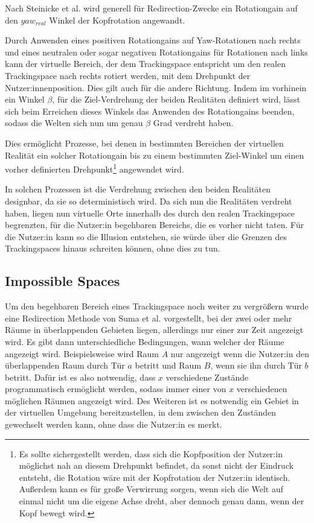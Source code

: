 Nach Steinicke et al. \cite{detection-thresholds} wird generell für Redirection-Zwecke ein Rotationgain auf den $yaw_{real}$ Winkel der Kopfrotation angewandt.

Durch Anwenden eines positiven Rotationgains auf Yaw-Rotationen nach rechts und eines neutralen oder sogar negativen Rotationgains für Rotationen nach links kann der virtuelle Bereich, der dem Trackingspace entspricht um den realen Trackingspace nach rechts rotiert werden, mit dem Drehpunkt der Nutzer:innenposition. Dies gilt auch für die andere Richtung. Indem im vorhinein ein Winkel $\beta$, für die Ziel-Verdrehung der beiden Realitäten definiert wird, lässt sich beim Erreichen dieses Winkels das Anwenden des Rotationgains beenden, sodass die Welten sich nun um genau $\beta$ Grad verdreht haben.

Dies ermöglicht Prozesse, bei denen in bestimmten Bereichen der virtuellen Realität ein solcher  Rotationgain bis zu einem bestimmten Ziel-Winkel um einen vorher definierten Drehpunkt\footnote{Es sollte sichergestellt werden, dass sich die Kopfposition der Nutzer:in möglichst nah an diesem Drehpunkt befindet, da sonst nicht der Eindruck entsteht, die Rotation wäre mit der Kopfrotation der Nutzer:in identisch. Außerdem kann es für große Verwirrung sorgen, wenn sich die Welt auf einmal nicht um die eigene Achse dreht, aber dennoch genau dann, wenn der Kopf bewegt wird.} angewendet wird.

In solchen Prozessen ist die Verdrehung zwischen den beiden Realitäten designbar, da sie so deterministisch wird. Da sich nun die Realitäten verdreht haben, liegen nun virtuelle Orte innerhalb des durch den realen Trackingspace begrenzten, für die Nutzer:in begehbaren Bereichs, die es vorher nicht taten.
Für die Nutzer:in kann so die Illusion entstehen, sie würde über die Grenzen des Trackingspaces hinaus schreiten können, ohne dies zu tun. %

\subsection{Impossible Spaces}
Um den begehbaren Bereich eines Trackingspace noch weiter zu vergrößern wurde eine Redirection Methode von Suma et al. \cite{impossible-spaces-suma} vorgestellt, bei der zwei oder mehr Räume in überlappenden Gebieten liegen, allerdings nur einer zur Zeit angezeigt wird. Es gibt dann unterschiedliche Bedingungen, wann welcher der Räume angezeigt wird. Beispielsweise wird Raum $A$ nur angezeigt wenn die Nutzer:in den überlappenden Raum durch Tür $a$ betritt und Raum $B$, wenn sie ihn durch Tür $b$ betritt.
Dafür ist es also notwendig, dass $x$ verschiedene Zustände programmatisch ermöglicht werden, sodass immer einer von $x$ verschiedenen möglichen Räumen angezeigt wird.
Des Weiteren ist es notwendig ein Gebiet in der virtuellen Umgebung bereitzustellen, in dem zwischen den Zuständen gewechselt werden kann, ohne dass die Nutzer:in es merkt.

